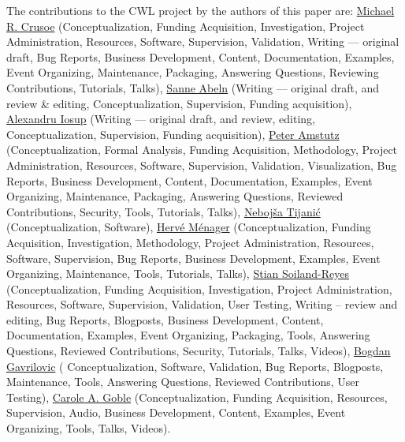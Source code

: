 \documentclass[sigconf,revew,screen,timestamp,nonacm]{acmart}
\newcommand{\addition}[1]{{\color{brown} #1}}
\newcommand{\contributor}[3]
{\normalsize\href{#1}{#2} \small(#3)\normalsize}
\begin{document}
\begin{acks}
The contributions to the CWL project by the authors of this paper are:
\contributor{https://orcid.org/0000-0002-2961-9670}{Michael R. Crusoe}{Conceptualization, Funding Acquisition, Investigation, Project Administration, Resources, Software, Supervision, Validation, Writing --- original draft, Bug Reports, Business Development, Content, Documentation, Examples, Event Organizing, Maintenance, Packaging, Answering Questions, Reviewing Contributions, Tutorials, Talks},
\contributor{https://orcid.org/0000-0002-2779-7174}{Sanne Abeln}{Writing --- original draft, and review \& editing, Conceptualization, Supervision, Funding acquisition},
\contributor{https://orcid.org/0000-0001-8030-9398}{Alexandru Iosup}{Writing --- original draft, and review, editing, Conceptualization, Supervision, Funding acquisition},
\contributor{https://orcid.org/0000-0003-3566-7705}{Peter Amstutz}{Conceptualization, Formal Analysis, Funding Acquisition, Methodology, Project Administration, Resources, Software, Supervision, Validation, Visualization, Bug Reports, Business Development, Content, Documentation, Examples, Event Organizing, Maintenance, Packaging, Answering Questions, Reviewed Contributions, Security, Tools, Tutorials, Talks},
\contributor{https://orcid.org/0000-0001-8316-4067}{Nebojša Tijanić}{Conceptualization, Software},
\contributor{https://orcid.org/0000-0002-7552-1009}{Hervé Ménager}{Conceptualization, Funding Acquisition, Investigation, Methodology, Project Administration, Resources, Software, Supervision, Bug Reports, Business Development, Examples, Event Organizing, Maintenance, Tools, Tutorials, Talks},
\contributor{https://orcid.org/0000-0001-9842-9718}{Stian Soiland-Reyes}{Conceptualization, Funding Acquisition, Investigation, Project Administration, Resources, Software, Supervision, Validation, User Testing, Writing – review and editing, Bug Reports, Blogposts, Business Development, Content, Documentation, Examples, Event Organizing, Packaging, Tools, Answering Questions, Reviewed Contributions, Security, Tutorials, Talks, Videos},
\contributor{https://orcid.org/0000-0003-1550-1716}{\addition{Bogdan Gavrilovic}}{\addition{Conceptualization, Software, Validation, Bug Reports, Blogposts, Maintenance, Tools, Answering Questions, Reviewed Contributions, User Testing}},
\contributor{https://orcid.org/0000-0003-1219-2137}{Carole A. Goble}{Conceptualization, Funding Acquisition, Resources, Supervision, Audio, Business Development, Content, Examples, Event Organizing, Tools, Talks, Videos}.


\end{acks}
\end{document}
